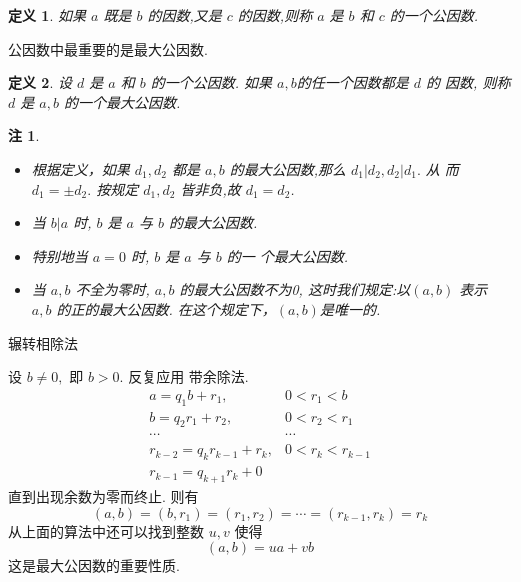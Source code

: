 \documentclass[13pt]{beamer}
\newtheorem*{defi}{定义}
\newtheorem*{rem}{注}
\begin{document}
\begin{frame}
\begin{defi}
如果 $a$ 既是 $b$ 的因数,又是 $c$ 的因数,则称 $a$ 是 $b$ 和 $c$ 的一个\alert{公因数}.
\end{defi}
公因数中最重要的是最大公因数.

\begin{defi}
设 $d$ 是 $a$ 和 $b$ 的一个公因数. 如果 $a, b $的任一个因数都是 $d$ 的
因数, 则称 $d$ 是 $a, b$ 的一个\alert{最大公因数}.
\end{defi}

\begin{rem}
	\begin{itemize}
\item 根据定义，如果 $d_{1}, d_{2}$ 都是 $a, b$ 的最大公因数,那么 $d_{1}\left|d_{2}, d_{2}\right| d_{1} .$ 从
而 $d_{1}=\pm d_{2} .$ 
按规定 $d_{1}, d_{2}$ 皆非负,故 $d_{1}=d_{2}$.

\item 当 $b | a$ 时, $b$ 是 $a$ 与 $b$ 的最大公因数.

\item 特别地当 $a=0$ 时, $b$ 是 $a$ 与 $b$ 的一 个最大公因数.
 
\item 当 $a, b$  不全为零时, $a,b$ 的最大公因数不为0,  这时我们规定:以$(a, b)$ 表示 $a, b$ 的正的最大公因数. 在这个规定下，$(a, b)$是唯一的. 
\end{itemize}
\end{rem}
\end{frame}

\begin{frame}{辗转相除法}

设 $b \neq 0,$ 即 $b>0 .$ 反复应用 带余除法. 
	\[
	\begin{array}{cc}
	a=q_{1} b+r_{1}, & 0<r_{1}<b \\
	b=q_{2} r_{1}+r_{2}, & 0<r_{2}<r_{1} \\
	\cdots  & \cdots  \\
	r_{k-2}=q_{k} r_{k-1}+r_{k}, & 0<r_{k}<r_{k-1} \\
	r_{k-1}=q_{k+1} r_{k}+0
	\end{array}
	\]
	直到出现余数为零而终止. 则有
	\[
	(a, b)=\left(b, r_{1}\right)=\left(r_{1}, r_{2}\right)=\cdots=\left(r_{k-1}, r_{k}\right)=r_{k}
	\]
	从上面的算法中还可以找到整数 $u, v$ 使得
	\[
	(a, b)=u a+v b
	\]
	这是最大公因数的重要性质.
\end{frame}
\end{document}
